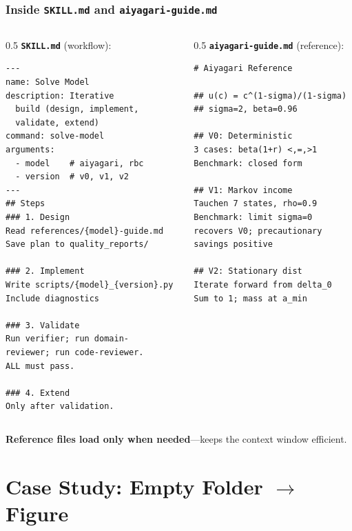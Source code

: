 \documentclass[10pt,english,aspectratio=169]{beamer}
\begin{document}
\begin{frame}[fragile]
\frametitle{Inside \texttt{SKILL.md} and \texttt{aiyagari-guide.md}}

\begin{columns}[T]
\begin{column}{0.5\textwidth}
\textbf{\texttt{SKILL.md}} (workflow):
\begin{lstlisting}[style=pythonstyle,language={},basicstyle=\ttfamily\tiny,numbers=none]
---
name: Solve Model
description: Iterative
  build (design, implement,
  validate, extend)
command: solve-model
arguments:
  - model    # aiyagari, rbc
  - version  # v0, v1, v2
---
## Steps
### 1. Design
Read references/{model}-guide.md
Save plan to quality_reports/

### 2. Implement
Write scripts/{model}_{version}.py
Include diagnostics

### 3. Validate
Run verifier; run domain-
reviewer; run code-reviewer.
ALL must pass.

### 4. Extend
Only after validation.
\end{lstlisting}
\end{column}
\begin{column}{0.5\textwidth}
\textbf{\texttt{aiyagari-guide.md}} (reference):
\begin{lstlisting}[style=pythonstyle,language={},basicstyle=\ttfamily\tiny,numbers=none]
# Aiyagari Reference

## u(c) = c^(1-sigma)/(1-sigma)
## sigma=2, beta=0.96

## V0: Deterministic
3 cases: beta(1+r) <,=,>1
Benchmark: closed form

## V1: Markov income
Tauchen 7 states, rho=0.9
Benchmark: limit sigma=0
recovers V0; precautionary
savings positive

## V2: Stationary dist
Iterate forward from delta_0
Sum to 1; mass at a_min
\end{lstlisting}
\end{column}
\end{columns}

\textbf{Reference files load only when needed}---keeps the context window efficient.
\end{frame}

\section{Case Study: Empty Folder $\to$ Figure}
\end{document}
